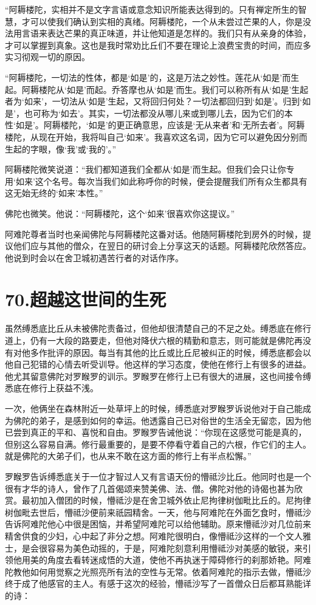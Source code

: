 \documentclass[12pt,twoside,openany]{book}
\begin{document}
“阿耨楼陀，实相并不是文字言语或意念知识所能表达得到的。只有禅定所生的智慧，才可以使我们确认到实相的真绪。阿耨楼陀，一个从未尝过芒果的人，你是没法用言语来表达芒果的真正味道，并让他知道是怎样的。我们只有从亲身的体验，才可以掌握到真象。这也是我时常劝比丘们不要在理论上浪费宝贵的时间，而应多实习彻观一切的原因。

“阿耨楼陀，一切法的性体，都是‘如是’的，这是万法之妙性。莲花从‘如是’而生起。阿耨楼陀从‘如是’而起。乔答摩也从‘如是’而生。我们可以称所有从‘如是’生起者为‘如来’，一切法从‘如是’生起，又将回归何处？一切法都回归到‘如是’。归到‘如是’，也可称为‘如去’。其实，一切法都没从哪儿来或到哪儿去，因为它们的本性‘如是’。阿耨楼陀，‘如是’的更正确意思，应该是‘无从来者’和‘无所去者’。阿耨楼陀，从现在开始，我将叫自己‘如来’。我喜欢这名词，因为它可以避免因分别而生起的字眼，像‘我’或‘我的’。”

阿耨楼陀微笑说道：“我们都知道我们全都从‘如是’而生起。但我们会只让你专用‘如来’这个名号。每次当我们如此称呼你的时候，便会提醒我们所有众生都具有这无始无终的‘如来’本性。”

佛陀也微笑。他说：“阿耨楼陀，这个‘如来’很喜欢你这提议。”

阿难陀尊者当时也亲闻佛陀与阿耨楼陀这番对话。他随阿耨楼陀到房外的时候，提议他们应与其他的僧众，在翌日的研讨会上分享这天的话题。阿耨楼陀欣然答应。他说到时会以在舍卫城初遇苦行者的对话作序。


\chapter{70.超越这世间的生死}\label{ch70}

虽然缚悉底比丘从未被佛陀责备过，但他却很清楚自己的不足之处。缚悉底在修行道上，仍有一大段的路要走，但他对降伏六根的精勤和意志，则可能就是佛陀再没有对他多作批评的原因。每当有其他的比丘或比丘尼被纠正的时候，缚悉底都会以他自己犯错的心情去听受训导。他这样的学习态度，使他在修行上有很多的进益。他尤其留意佛陀对罗睺罗的训示。罗睺罗在修行上已有很大的进展，这也间接令缚悉底在修行上获益不浅。

一次，他俩坐在森林附近一处草坪上的时候，缚悉底对罗睺罗诉说他对于自己能成为佛陀的弟子，是感到如何的幸运。他透露自己已对俗世的生活全无留恋，因为他已尝到真正的平和、喜悦和自由。罗睺罗告诫他说：“你现在这感觉可能是真的，但别这么容易自满。修行最重要的，是要不停看守着自己的六根，作它们的主人。就是佛陀的大弟子们，也从来不敢在这方面的修行上有半点松懈。”

罗睺罗告诉缚悉底关于一位才智过人又有言语天份的懵祗沙比丘。他同时也是一个很有才华的诗人，曾作了几首偈颂来赞美佛、法、僧。佛陀对他的诗偈也甚为欣赏。最初加入僧团的时候，懵祗沙是在舍卫城外依止尼拘律树伽毗比丘的。尼拘律树伽毗去世后，懵祗沙便前来祇园精舍。一天，他与阿难陀在外面乞食时，懵祗沙告诉阿难陀他心中很是困恼，并希望阿难陀可以给他辅助。原来懵祗沙对几位前来精舍供食的少妇，心中起了非分之想。阿难陀很明白，像懵祗沙这样的一个文人雅士，是会很容易为美色动摇的，于是，阿难陀刻意利用懵祗沙对美感的敏锐，来引领他用美的角度去看转迷成悟的大道，使他不再执迷于障碍修行的刹那娇艳。阿难陀教他如何用觉察之光照亮所有法的空性与无常。依着阿难陀的指示去做，懵祗沙终于成了他感官的主人。有感于这次的经验，懵祗沙写了一首僧众日后都耳熟能详的诗：
\end{document}
